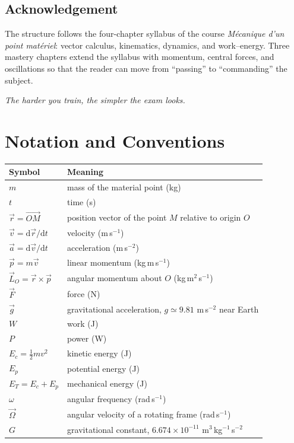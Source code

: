 \documentclass[11pt,oneside,openany]{book}
\newcommand{\dd}{\mathrm{d}}
\begin{document}
\section*{Acknowledgement}
The structure follows the four-chapter syllabus of the course
\emph{Mécanique d'un point matériel}: vector calculus, kinematics, dynamics, and
work--energy. Three mastery chapters extend the syllabus with momentum, central
forces, and oscillations so that the reader can move from ``passing'' to
``commanding'' the subject.

\vspace{1.5em}
\begin{flushright}
\emph{The harder you train, the simpler the exam looks.}
\end{flushright}

\chapter*{Notation and Conventions}

\begin{center}
\renewcommand{\arraystretch}{1.25}
\begin{longtable}{@{}p{}p{}@{}}
\toprule
\textbf{Symbol} & \textbf{Meaning} \\
\midrule
\endhead
$m$ & mass of the material point (kg) \\
$t$ & time (s) \\
$\vec{r}=\vec{OM}$ & position vector of the point $M$ relative to origin $O$ \\
$\vec{v}=\dd\vec{r}/\dd t$ & velocity (m\,s$^{-1}$) \\
$\vec{a}=\dd\vec{v}/\dd t$ & acceleration (m\,s$^{-2}$) \\
$\vec{p}=m\vec{v}$ & linear momentum (kg\,m\,s$^{-1}$) \\
$\vec{L}_O=\vec{r}\times\vec{p}$ & angular momentum about $O$ (kg\,m$^2$\,s$^{-1}$) \\
$\vec{F}$ & force (N) \\
$\vec{g}$ & gravitational acceleration, $g\simeq 9.81$ m\,s$^{-2}$ near Earth \\
$W$ & work (J) \\
$P$ & power (W) \\
$E_c=\tfrac12 mv^2$ & kinetic energy (J) \\
$E_p$ & potential energy (J) \\
$E_T=E_c+E_p$ & mechanical energy (J) \\
$\omega$ & angular frequency (rad\,s$^{-1}$) \\
$\vec{\Omega}$ & angular velocity of a rotating frame (rad\,s$^{-1}$) \\
$G$ & gravitational constant, $6.674\times10^{-11}$ m$^3$\,kg$^{-1}$\,s$^{-2}$ \\
\bottomrule
\end{longtable}
\end{center}
\end{document}
